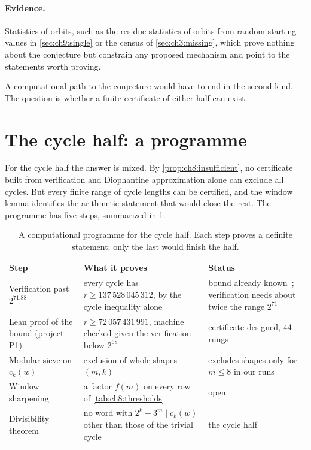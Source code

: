\paragraph{Evidence.} Statistics of orbits, such as the residue statistics of orbits from random starting values in \cref{sec:ch9:single} or the census of \cref{sec:ch3:missing}, which prove
nothing about the conjecture but constrain any proposed mechanism and point to
the statements worth proving.

A computational path to the conjecture would have to end in the second kind. The
question is whether a finite certificate of either half can exist.

\section{The cycle half: a programme}\label{sec:ch10b:cycles}

For the cycle half the answer is mixed. By \cref{prop:ch8:insufficient},
no certificate built from verification and Diophantine approximation alone can
exclude all cycles. But every finite range of cycle lengths can be certified,
and the window lemma identifies the arithmetic statement that would close the
rest. The programme has five steps, summarized in \cref{tab:ch10b:programme}.

\begin{table}[ht]
\centering\small
\caption{A computational programme for the cycle half. Each step proves a
definite statement; only the last would finish the half.}
\label{tab:ch10b:programme}
\setlength{\tabcolsep}{3pt}
\begin{tabular}{@{}p{}p{}p{}@{}}
\toprule
Step & What it proves & Status \\
\midrule
Verification past $2^{71.88}$ & every cycle has $r\ge137\,528\,045\,312$, by the cycle inequality alone & bound already known~\cite{hercher2023}; verification needs about twice the range $2^{71}$ \\
Lean proof of the bound (project P1) & $r\ge72\,057\,431\,991$, machine checked given the verification below $2^{68}$ & certificate designed, $44$ rungs \\
Modular sieve on $c_k(w)$ & exclusion of whole shapes $(m,k)$ & excludes shapes only for $m\le8$ in our runs \\
Window sharpening & a factor $f(m)$ on every row of \cref{tab:ch8:thresholds} & open \\
Divisibility theorem & no word with $2^k-3^m\mid c_k(w)$ other than those of the trivial cycle & the cycle half \\
\bottomrule
\end{tabular}
\end{table}

